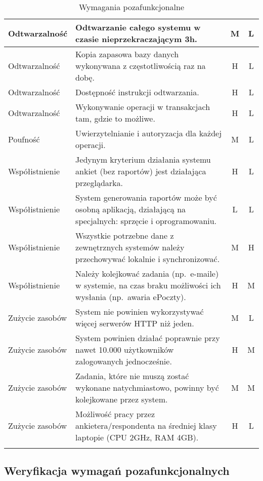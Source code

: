 \begin{center}
\begin{longtable}{ | p{4cm} | p{9cm} | c | c | }
%
Odtwarzalność & Odtwarzanie całego systemu w czasie nieprzekraczającym 3h. & M & L \\ \hline
Odtwarzalność & Kopia zapasowa bazy danych wykonywana z częstotliwością raz na dobę. & H & L \\ \hline
Odtwarzalność & Dostępność instrukcji odtwarzania. & H & L \\ \hline
Odtwarzalność & Wykonywanie operacji w transakcjach tam, gdzie to możliwe. & H & L \\ \hline
%
Poufność & Uwierzytelnianie i autoryzacja dla każdej operacji. & M & L \\ \hline
%
Współistnienie & Jedynym kryterium działania systemu ankiet (bez raportów) jest działająca przeglądarka. & H & L \\ \hline
Współistnienie & System generowania raportów może być osobną aplikacją, działającą na specjalnych: sprzęcie i oprogramowaniu. & L & L \\ \hline
Współistnienie & Wszystkie potrzebne dane z zewnętrznych systemów należy przechowywać lokalnie i synchronizować. & M & H \\ \hline
Współistnienie & Należy kolejkować zadania (np.~e-maile) w systemie, na czas braku możliwości ich wysłania (np.~awaria ePoczty). & H & M \\ \hline
%
Zużycie zasobów & System nie powinien wykorzystywać więcej serwerów HTTP niż jeden. & M & L \\ \hline
Zużycie zasobów & System powinien działać poprawnie przy nawet 10.000 użytkowników zalogowanych jednocześnie. & H & M \\ \hline
Zużycie zasobów & Zadania, które nie muszą zostać wykonane natychmiastowo, powinny być kolejkowane przez system. & M & M \\ \hline
Zużycie zasobów & Możliwość pracy przez ankietera\slash respondenta na średniej klasy laptopie (CPU 2GHz, RAM 4GB). & H & L \\ \hline
%
\caption{Wymagania pozafunkcjonalne}\label{tab:reqs}
\end{longtable}
\end{center}

\subsection{Weryfikacja wymagań pozafunkcjonalnych}
\label{Chapter432}

